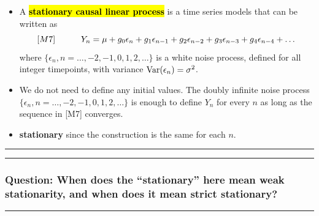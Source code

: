 \documentclass[]{article}
\begin{document}
\begin{itemize}
\item
  A \textbf{\hl{stationary causal linear process}} is a time series models
  that can be written as 
  $$[M7]
  \quad\quad\quad Y_n = \mu + g_0\epsilon_n + g_1\epsilon_{n-1}+g_2\epsilon_{n-2}+g_3\epsilon_{n-3} + g_4\epsilon_{n-4}+\dots$$
  where \(\{\epsilon_n, n=\dots,-2,-1,0,1,2,\dots\}\) is a white noise
  process, defined for all integer timepoints, with variance
  \(\mathrm{Var}(\epsilon_n)=\sigma^2\).
\item
  We do not need to define any initial values. The doubly infinite noise
  process \(\{\epsilon_n, n=\dots,-2,-1,0,1,2,\dots\}\) is enough to
  define \(Y_n\) for every \(n\) as long as the sequence in {[}M7{]}
  converges.
\item
  \textbf{stationary} since the construction is the same for each \(n\).
\end{itemize}

\begin{center}\rule{0.5\linewidth}{\linethickness}\end{center}

\begin{center}\rule{0.5\linewidth}{\linethickness}\end{center}

\subsubsection{\texorpdfstring{Question: When does the ``stationary''
here mean weak stationarity, and when does it mean strict
stationary?}{Question: When does the stationary here mean weak stationarity, and when does it mean strict stationary?}}\label{question-when-does-the-stationary-here-mean-weak-stationarity-and-when-does-it-mean-strict-stationary}

\begin{center}\rule{0.5\linewidth}{\linethickness}\end{center}
\end{document}
